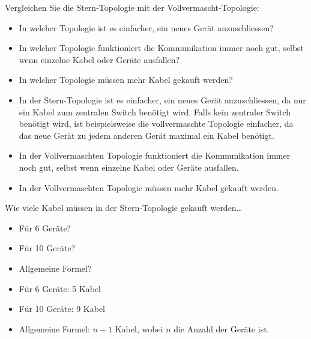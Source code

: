 \begin{myexercise}
	Vergleichen Sie die Stern-Topologie mit der Vollvermascht-Topologie:
	\begin{itemize}
		\item In welcher Topologie ist es einfacher, ein neues Gerät anzuschliessen?
		\item In welcher Topologie funktioniert die Kommunikation immer noch gut, selbst wenn einzelne Kabel oder Geräte ausfallen?
		\item In welcher Topologie müssen mehr Kabel gekauft werden?
	\end{itemize}
	\begin{myanswer}
		\begin{itemize}
			\item In der Stern-Topologie ist es einfacher, ein neues Gerät anzuschliessen, da nur ein Kabel zum zentralen Switch benötigt wird. Falls kein zentraler Switch benötigt wird, ist beispielsweise die vollvermaschte Topologie einfacher, da das neue Gerät zu jedem anderen Gerät maximal ein Kabel benötigt.
			\item In der Vollvermaschten Topologie funktioniert die Kommunikation immer noch gut, selbst wenn einzelne Kabel oder Geräte ausfallen.
			\item In der Vollvermaschten Topologie müssen mehr Kabel gekauft werden.
		\end{itemize}
	\end{myanswer}
\end{myexercise}

\begin{myexercise}
	Wie viele Kabel müssen in der Stern-Topologie gekauft werden\dots
	\begin{itemize}
		\item Für 6 Geräte?
		\item Für 10 Geräte?
		\item Allgemeine Formel?
	\end{itemize}
	\begin{myanswer}
		\begin{itemize}
			\item Für 6 Geräte: 5 Kabel
			\item Für 10 Geräte: 9 Kabel
			\item Allgemeine Formel: $n-1$ Kabel, wobei $n$ die Anzahl der Geräte ist.
		\end{itemize}
	\end{myanswer}
\end{myexercise}

